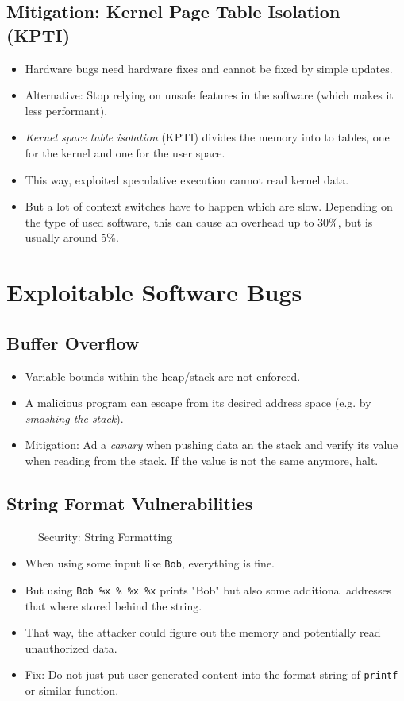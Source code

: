 		\subsection{Mitigation: Kernel Page Table Isolation (KPTI)}
			\begin{itemize}
				\item Hardware bugs need hardware fixes and cannot be fixed by simple updates.
				\item Alternative: Stop relying on unsafe features in the software (which makes it less performant).
				\item \textit{Kernel space table isolation} (KPTI) divides the memory into to tables, one for the kernel and one for the user space.
				\item This way, exploited speculative execution cannot read kernel data.
				\item But a lot of context switches have to happen which are slow. Depending on the type of used software, this can cause an overhead up to 30\%, but is usually around 5\%.
			\end{itemize}

	\section{Exploitable Software Bugs}
		\subsection{Buffer Overflow}
			\begin{itemize}
				\item Variable bounds within the heap/stack are not enforced.
				\item A malicious program can escape from its desired address space (e.g. by \textit{smashing the stack}).
				\item Mitigation: Ad a \textit{canary} when pushing data an the stack and verify its value when reading from the stack. If the value is not the same anymore, halt.
			\end{itemize}

		\subsection{String Format Vulnerabilities}
			\begin{figure}[H]
				\centering
				
				\caption{Security: String Formatting}
			\end{figure}
			\begin{itemize}
				\item When using some input like \texttt{Bob}, everything is fine.
				\item But using \texttt{Bob \%x \% \%x \%x} prints "Bob" but also some additional addresses that where stored behind the string.
				\item That way, the attacker could figure out the memory and potentially read unauthorized data.
				\item Fix: Do not just put user-generated content into the format string of \texttt{printf} or similar function.
			\end{itemize}

